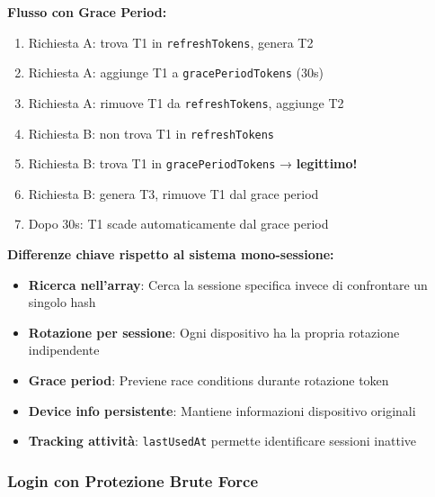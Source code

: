 \documentclass[11pt,a4paper]{article}
\newcommand{\code}[1]{\texttt{#1}}
\newcommand{\important}[1]{\textcolor{red!80!black}{\textbf{#1}}}
\begin{document}
\textbf{Flusso con Grace Period:}
\begin{enumerate}
    \item Richiesta A: trova T1 in \code{refreshTokens}, genera T2
    \item Richiesta A: aggiunge T1 a \code{gracePeriodTokens} (30s)
    \item Richiesta A: rimuove T1 da \code{refreshTokens}, aggiunge T2
    \item Richiesta B: non trova T1 in \code{refreshTokens}
    \item Richiesta B: trova T1 in \code{gracePeriodTokens} → \important{legittimo!}
    \item Richiesta B: genera T3, rimuove T1 dal grace period
    \item Dopo 30s: T1 scade automaticamente dal grace period
\end{enumerate}

\textbf{Differenze chiave rispetto al sistema mono-sessione:}
\begin{itemize}
    \item \textbf{Ricerca nell'array}: Cerca la sessione specifica invece di confrontare un singolo hash
    \item \textbf{Rotazione per sessione}: Ogni dispositivo ha la propria rotazione indipendente
    \item \textbf{Grace period}: Previene race conditions durante rotazione token
    \item \textbf{Device info persistente}: Mantiene informazioni dispositivo originali
    \item \textbf{Tracking attività}: \code{lastUsedAt} permette identificare sessioni inattive
\end{itemize}

\subsubsection{Login con Protezione Brute Force}
\end{document}
